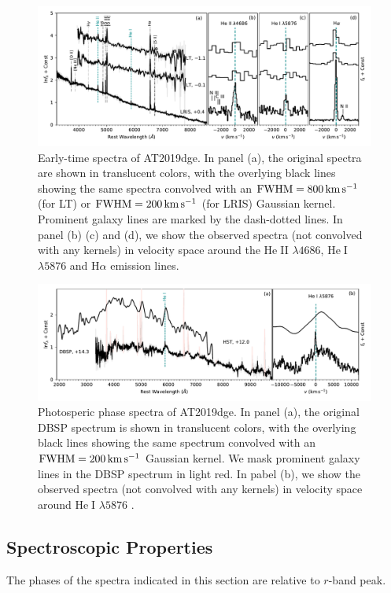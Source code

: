 \documentclass[twocolumn]{aastex63}
\def\ion#1#2{#1$\;${\footnotesize\rm{#2}}\relax}
\begin{document}
\begin{CJK*}{UTF8}{gbsn}
\begin{figure}[htbp!]
	\centering
	\includegraphics[width=\textwidth]{figures/spectra_early.pdf}
	\caption{Early-time spectra of AT2019dge.  In panel (a), the original spectra are	
		shown in translucent colors, with the overlying black lines showing the same spectra convolved 
		with an ${\rm FWHM} = 800\, {\rm km\, s^{-1}}$ (for LT)  or ${\rm FWHM} = 200\, {\rm km\, 
			s^{-1}}$ (for LRIS) Gaussian kernel. Prominent galaxy lines are marked by the 
		dash-dotted lines. In panel (b) (c) and (d), we show the observed spectra (not convolved with any 
		kernels) in velocity space around the \ion{He}{II} $\lambda 4686$, \ion{He}{I} $\lambda 5876$ and 
		H$\alpha$ emission lines.
		\label{fig:spectra_early}}
\end{figure}

\begin{figure}[htbp!]
	\centering
	\includegraphics[width=\textwidth]{figures/spectra_phot.pdf}
	\caption{Photosperic phase spectra of AT2019dge. In panel (a), the original DBSP 
	spectrum is shown in translucent colors, with the overlying black lines showing the same spectrum 
	convolved with an ${\rm FWHM} = 200\, {\rm km\, s^{-1}}$ Gaussian kernel. We mask prominent 
	galaxy lines in the DBSP spectrum in light red. In pabel (b), we show the observed spectra (not 
	convolved with any kernels) in velocity space around \ion{He}{I} $\lambda 5876$ .
		\label{fig:spectra}}
\end{figure}

\subsection{Spectroscopic Properties}\label{subsec:spec_properties}
The phases of the spectra indicated in this section are relative to $r$-band peak.

\end{CJK*}
\end{document}
